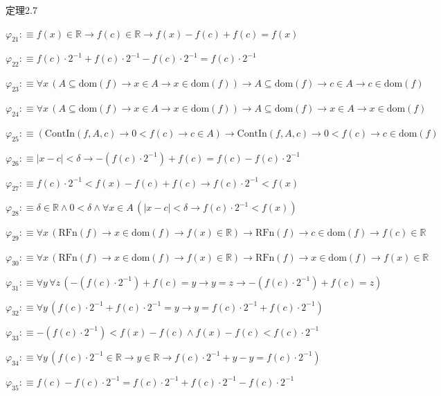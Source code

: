 \begin{fullproof}{定理2.7}
\begin{abbrevlist}
\item $\varphi_{21} :\equiv f(x) \in \mathbb{R} \to f(c) \in \mathbb{R} \to f(x) - f(c) + f(c) = f(x)$
\item $\varphi_{22} :\equiv f(c) \cdot 2^{-1} + f(c) \cdot 2^{-1} - f(c) \cdot 2^{-1} = f(c) \cdot 2^{-1}$
\item $\varphi_{23} :\equiv \forall x\,(A \subseteq \mathrm{dom}(f) \to x \in A \to x \in \mathrm{dom}(f)) \to A \subseteq \mathrm{dom}(f) \to c \in A \to c \in \mathrm{dom}(f)$
\item $\varphi_{24} :\equiv \forall x\,(A \subseteq \mathrm{dom}(f) \to x \in A \to x \in \mathrm{dom}(f)) \to A \subseteq \mathrm{dom}(f) \to x \in A \to x \in \mathrm{dom}(f)$
\item $\varphi_{25} :\equiv (\mathrm{ContIn}(f,A,c) \to 0 < f(c) \to c \in A) \to \mathrm{ContIn}(f,A,c) \to 0 < f(c) \to c \in \mathrm{dom}(f)$
\item $\varphi_{26} :\equiv \lvert x - c \rvert < \delta \to -(f(c) \cdot 2^{-1}) + f(c) = f(c) - f(c) \cdot 2^{-1}$
\item $\varphi_{27} :\equiv f(c) \cdot 2^{-1} < f(x) - f(c) + f(c) \to f(c) \cdot 2^{-1} < f(x)$
\item $\varphi_{28} :\equiv \delta \in \mathbb{R} \land 0 < \delta \land \forall x \in A\,(\lvert x - c \rvert < \delta \to f(c) \cdot 2^{-1} < f(x))$
\item $\varphi_{29} :\equiv \forall x\,(\mathrm{RFn}(f) \to x \in \mathrm{dom}(f) \to f(x) \in \mathbb{R}) \to \mathrm{RFn}(f) \to c \in \mathrm{dom}(f) \to f(c) \in \mathbb{R}$
\item $\varphi_{30} :\equiv \forall x\,(\mathrm{RFn}(f) \to x \in \mathrm{dom}(f) \to f(x) \in \mathbb{R}) \to \mathrm{RFn}(f) \to x \in \mathrm{dom}(f) \to f(x) \in \mathbb{R}$
\item $\varphi_{31} :\equiv \forall y\,\forall z\,(-(f(c) \cdot 2^{-1}) + f(c) = y \to y = z \to -(f(c) \cdot 2^{-1}) + f(c) = z)$
\item $\varphi_{32} :\equiv \forall y\,(f(c) \cdot 2^{-1} + f(c) \cdot 2^{-1} = y \to y = f(c) \cdot 2^{-1} + f(c) \cdot 2^{-1})$
\item $\varphi_{33} :\equiv -(f(c) \cdot 2^{-1}) < f(x) - f(c) \land f(x) - f(c) < f(c) \cdot 2^{-1}$
\item $\varphi_{34} :\equiv \forall y\,(f(c) \cdot 2^{-1} \in \mathbb{R} \to y \in \mathbb{R} \to f(c) \cdot 2^{-1} + y - y = f(c) \cdot 2^{-1})$
\item $\varphi_{35} :\equiv f(c) - f(c) \cdot 2^{-1} = f(c) \cdot 2^{-1} + f(c) \cdot 2^{-1} - f(c) \cdot 2^{-1}$

\end{abbrevlist}
\end{fullproof}
